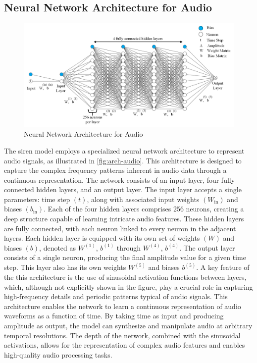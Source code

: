 \documentclass{ioereport}
\begin{document}
\subsection{Neural Network Architecture for Audio}
\begin{figure}[H]
    \centering
    \includegraphics[width=\linewidth]{assets/audio_neural.png}
    \caption{Neural Network Architecture for Audio}
    \label{fig:arch-audio}
\end{figure}
The \gls{siren} model employs a specialized neural network architecture to represent audio signals, as illustrated in \autoref{fig:arch-audio}. This architecture is designed to capture the complex frequency patterns inherent in audio data through a continuous representation.
The network consists of an input layer, four fully connected hidden layers, and an output layer. The input layer accepts a single parameters: time step $(t)$, along with associated input weights $(W_{\text{in}})$ and biases $(b_{\text{in}})$. Each of the four hidden layers comprises 256 neurons, creating a deep structure capable of learning intricate audio features. These hidden layers are fully connected, with each neuron linked to every neuron in the adjacent layers. Each hidden layer is equipped with its own set of weights $(W)$ and biases $(b)$, denoted as $W^{(1)}$, $b^{(1)}$ through $W^{(4)}$, $b^{(4)}$.
The output layer consists of a single neuron, producing the final amplitude value for a given time step. This layer also has its own weights $W^{(5)}$ and biases $b^{(5)}$. A key feature of the this architecture is the use of sinusoidal activation functions between layers, which, although not explicitly shown in the figure, play a crucial role in capturing high-frequency details and periodic patterns typical of audio signals.
This architecture enables the network to learn a continuous representation of audio waveforms as a function of time. By taking time as input and producing amplitude as output, the model can synthesize and manipulate audio at arbitrary temporal resolutions. The depth of the network, combined with the sinusoidal activations, allows for the representation of complex audio features and enables high-quality audio processing tasks.
\end{document}
